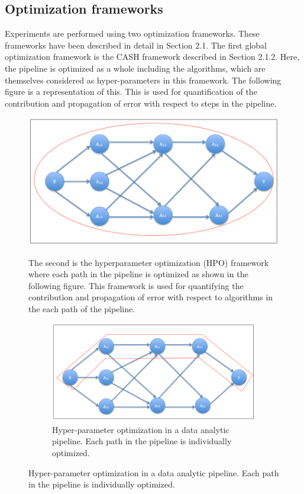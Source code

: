 \subsection{Optimization frameworks}
Experiments are performed using two optimization frameworks. These frameworks have been described in detail in Section 2.1. 
The first global optimization framework is the CASH framework described in Section 2.1.2. Here, the pipeline is optimized as a whole including the algorithms, which are themselves considered as hyper-parameters in this framework. The following figure is a representation of this. This is used for quantification of the contribution and propagation of error with respect to steps in the pipeline.
\begin{figure}[H]
    \centering
    \includegraphics[scale=0.4]{img/EP/CASH}
    \caption{Combined algorithm selection and hyper-parameter optimization in a data analytic pipeline. The algorithms and corresponding hyper-parameters are optimized simultaneously.}
    \label{fig:CASH}
The second is the hyperparameter optimization (HPO) framework where each path in the pipeline is optimized as shown in the following figure. This framework is used for quantifying the contribution and propagation of error with respect to algorithms in the each path of the pipeline.
\begin{figure}[H]
    \centering
    \includegraphics[scale=0.4]{img/EP/HPO}
    \caption{Hyper-parameter optimization in a data analytic pipeline. Each path in the pipeline is individually optimized.}
    \label{fig:HPO}
\end{figure}
\end{figure}
